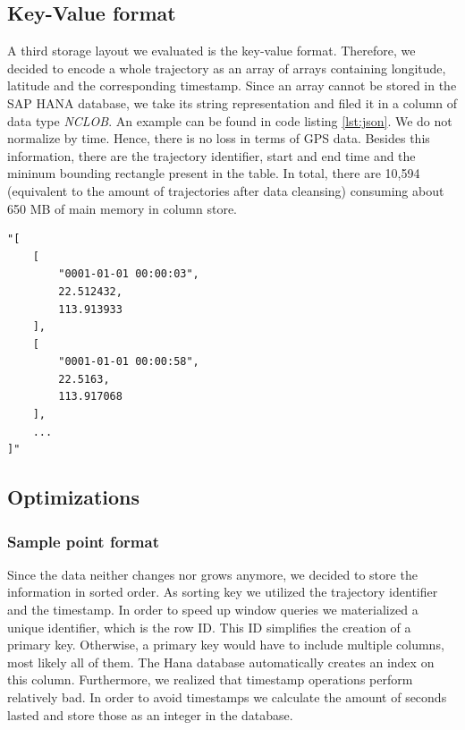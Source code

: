 \documentclass[10pt]{sig-alternate}
\begin{document}
\subsection{Key-Value format}

A third storage layout we evaluated is the key-value format. Therefore, we decided to encode a whole trajectory as an array of arrays containing longitude, latitude and the corresponding timestamp. Since an array cannot be stored in the SAP HANA database, we take its string representation and filed it in a column of data type \textit{NCLOB}. An example can be found in code listing \ref{lst:json}. We do not normalize by time. Hence, there is no loss in terms of GPS data. Besides this information, there are the trajectory identifier, start and end time and the mininum bounding rectangle present in the table. In total, there are 10,594 (equivalent to the amount of trajectories after data cleansing) consuming about 650 MB of main memory in column store.

\lstset{language=json}
\begin{minipage}{0.45\textwidth}
\begin{lstlisting}[frame=single, firstnumber=1, caption=Key-Value format example entry,label=lst:json]
"[
    [
        "0001-01-01 00:00:03",
        22.512432,
        113.913933
    ],
    [
        "0001-01-01 00:00:58",
        22.5163,
        113.917068
    ],
    ...
]"
\end{lstlisting}
\end{minipage}


\subsection{Optimizations}

\subsubsection{Sample point format}

Since the data neither changes nor grows anymore, we decided to store the information in sorted order. As sorting key we utilized the trajectory identifier and the timestamp. In order to speed up window queries we materialized a unique identifier, which is the row ID. This ID simplifies the creation of a primary key. Otherwise, a primary key would have to include multiple columns, most likely all of them. The Hana database automatically creates an index on this column. Furthermore, we realized that timestamp operations perform relatively bad. In order to avoid timestamps we calculate the amount of seconds lasted and store those as an integer in the database.
\end{document}
